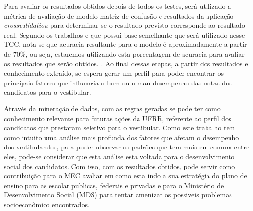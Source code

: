 \par
Para avaliar os resultados obtidos depois de todos os testes, será utilizado a métrica de avaliação de modelo matriz de confusão e resultados da aplicação \textit{crossvalidation} para determinar se o resultado previsto corresponde ao resultado real. Segundo os trabalhos  e  que possui base semelhante que será utilizado nesse TCC, nota-se que acuracia resultante para o modelo é aproximadamente a partir de 70\%, ou seja, estaremos utilizando esta porcentagem de acuracia para avaliar os resultados que serão obtidos. . Ao final dessas etapas, a partir dos resultados e conhecimento extraído, se espera gerar um perfil para poder encontrar os principais fatores que influencia o bom ou o mau desempenho das notas dos candidatos para o vestibular.

\par 
Através da mineração de dados, com as regras geradas se pode ter como conhecimento relevante para futuras ações da UFRR, referente ao perfil dos candidatos que prestaram seletivo para o vestibular. Como este trabalho tem como intuito uma análise mais profunda dos fatores que afetam o desempenho dos vestibulandos, para poder observar os padrões que tem mais em comum entre eles, pode-se considerar que esta análise esta voltada para o desenvolvimento social dos candidatos. Com isso, com os resultados obtidos, pode servir como contribuição para o MEC avaliar em como esta indo a sua estratégia do plano de ensino para as escolar publicas, federais e privadas e para o Ministério de Desenvolvimento Social (MDS) para tentar amenizar os possiveis problemas socioeconômico encontrados.

